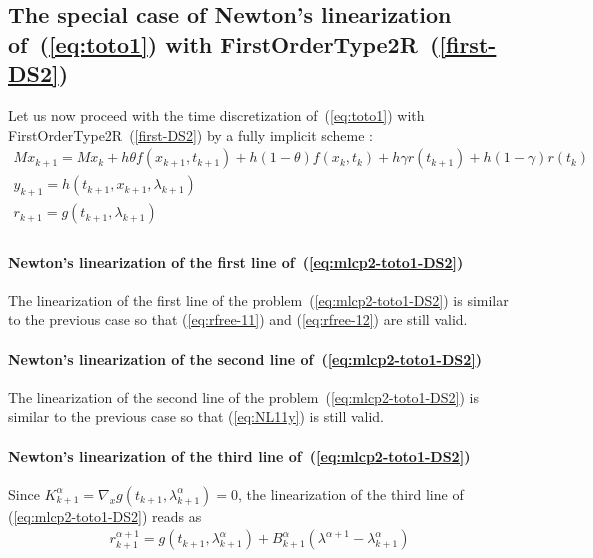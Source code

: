 

\subsection{The special case of Newton's linearization of~(\ref{eq:toto1}) with FirstOrderType2R~(\ref{first-DS2})} 


Let us now proceed with the time discretization of~(\ref{eq:toto1}) with FirstOrderType2R~(\ref{first-DS2})  by a fully implicit scheme : 
\begin{equation}
  \begin{array}{l}
    \label{eq:mlcp2-toto1-DS2}
     M x_{k+1} = M x_{k} +h\theta f(x_{k+1},t_{k+1})+h(1-\theta) f(x_k,t_k) + h \gamma r(t_{k+1})
     + h(1-\gamma)r(t_k)  \\[2mm]
     y_{k+1} =  h(t_{k+1},x_{k+1},\lambda _{k+1}) \\[2mm]
     r_{k+1} = g(t_{k+1},\lambda_{k+1})\\[2mm]
  \end{array}
\end{equation}


 \paragraph{Newton's linearization of the first line of~(\ref{eq:mlcp2-toto1-DS2})} The linearization of the first line of the  problem~(\ref{eq:mlcp2-toto1-DS2}) is similar to the previous case so that (\ref{eq:rfree-11}) and (\ref{eq:rfree-12}) are still valid.


 \paragraph{Newton's linearization of the second  line of~(\ref{eq:mlcp2-toto1-DS2})} The linearization of the second line of the  problem~(\ref{eq:mlcp2-toto1-DS2}) is similar to the previous case so that (\ref{eq:NL11y}) is still valid.

 \paragraph{Newton's linearization of the third  line of~(\ref{eq:mlcp2-toto1-DS2})}
Since $ K^{\alpha}_{k+1} = \nabla_xg(t_{k+1},\lambda ^{\alpha}_{k+1}) = 0 $, the linearization of the third line of (\ref{eq:mlcp2-toto1-DS2}) reads as
\begin{equation}
  \label{eq:mlcp2-rrL}
  \begin{array}{l}
    \boxed{r^{\alpha+1}_{k+1} = g(t_{k+1},\lambda ^{\alpha}_{k+1})     + B^{\alpha}_{k+1} ( \lambda^{\alpha+1}-  \lambda^{\alpha}_{k+1} )}       
  \end{array}
\end{equation}


